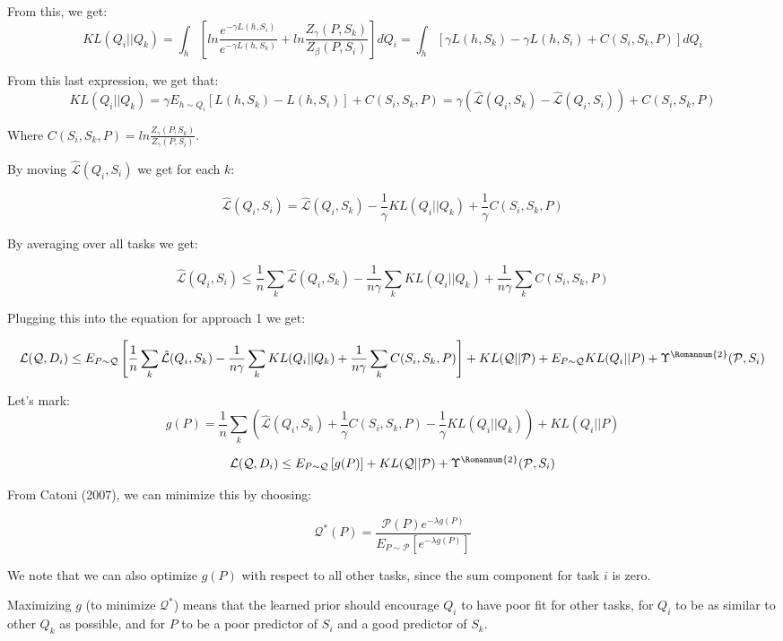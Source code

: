 \documentclass[letterpaper]{article}
\theoremstyle{definition}
\begin{document}
From this, we get: 
$$KL(Q_i||Q_k)=\int_h \left [ ln\frac{e^{-\gamma L(h,S_i)}}{e^{-\gamma L(h,S_k)} }+ln \frac{Z_{\gamma}(P,S_k)}{Z_{\beta}(P,S_i)} \right ] dQ_i=\int_h \left [ \gamma L(h,S_k)-\gamma L(h,S_i) +C(S_i,S_k,P) \right ] dQ_i$$

From this last expression, we get that:
$$KL(Q_i||Q_k)=\gamma E_{h\sim Q_i}[L(h,S_k)-L(h,S_i)]+C(S_i,S_k,P)=\gamma (\hat{\mathcal{L}}(Q_i,S_k)-\hat{\mathcal{L}}(Q_i,S_i))+C(S_i,S_k,P)$$

Where $C(S_i,S_k,P)=ln\frac{Z_{\gamma}(P,S_k)}{ Z_{\gamma}(P,S_i)}$.

By moving $\hat{\mathcal{L}}(Q_i,S_i)$ we get for each $k$:

$$ \hat{\mathcal{L}}(Q_i,S_i)= \hat{\mathcal{L}}(Q_i,S_k) - \frac{1}{\gamma} KL(Q_i||Q_k) + \frac{1}{\gamma}C(S_i,S_k,P)$$

By averaging over all tasks we get:

$$ \hat{\mathcal{L}}(Q_i,S_i)\leq \frac{1}{n}\sum_k\hat{\mathcal{L}}(Q_i,S_k) - \frac{1}{n\gamma} \sum_k KL(Q_i||Q_k) + \frac{1}{n\gamma}\sum_k C(S_i,S_k,P)$$

Plugging this into the equation for approach 1 we get:

$$ \mathcal{L}(\mathcal{Q}, D_i)\leq E_{P\sim \mathcal{Q}} \left [ \frac{1}{n}\sum_k\hat{\mathcal{L}}(Q_i,S_k) - \frac{1}{n\gamma} \sum_k KL(Q_i||Q_k) + \frac{1}{n\gamma}\sum_k C(S_i,S_k,P) \right ]+ KL(\mathcal{Q}||\mathcal{P})+ E_{P\sim \mathcal{Q}}KL(Q_i||P)+\Upsilon^{\text{\Romannum{2}}}(\mathcal{P}, S_i)$$

Let's mark:
$$g(P)=\frac{1}{n}\sum_k \left ( \hat{\mathcal{L}}(Q_i,S_k) + \frac{1}{\gamma} C(S_i,S_k,P) -   \frac{1}{\gamma}  KL(Q_i||Q_k) \right )+ KL(Q_i||P)$$

$$ \mathcal{L}(\mathcal{Q}, D_i)\leq E_{P\sim \mathcal{Q}}\left [g(P) \right ] + KL(\mathcal{Q}||\mathcal{P})+\Upsilon^{\text{\Romannum{2}}}(\mathcal{P}, S_i)$$

From Catoni (2007), we can minimize this by choosing:

$$\mathcal{Q}^{*}(P)=\frac{\mathcal{P}(P) e^{-\lambda g(P)}}{E_{P\sim \mathcal{P}} \left [ e^{-\lambda g(P) } \right ]}$$

We note that we can also optimize $g(P)$ with respect to all other tasks, since the sum component for task $i$ is zero.

Maximizing $g$ (to minimize $\mathcal{Q}^{*}$) means that the learned prior should encourage $Q_i$ to have poor fit for other tasks, for $Q_i$ to be as similar to other $Q_k$ as possible, and for $P$ to be a poor predictor of $S_i$ and a good predictor of $S_k$. 
\end{document}
